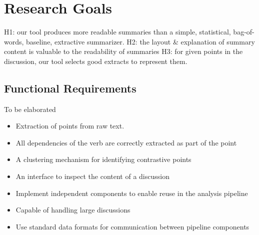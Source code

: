 \chapter{Research Goals\label{chap:requirements}}

  H1: our tool produces more readable summaries than a simple, statistical, bag-of-words, baseline, extractive summarizer.
  H2: the layout \& explanation of summary content is valuable to the readability of summaries
  H3: for given points in the discussion, our tool selects good extracts to represent them.

  \section{Functional Requirements}
    To be elaborated
    \begin{itemize}
      \item{Extraction of points from raw text.}
      \item{All dependencies of the verb are correctly extracted as part of the point}
      \item{A clustering mechanism for identifying contrastive points}
      \item{An interface to inspect the content of a discussion}
      \item{Implement independent components to enable reuse in the analysis pipeline}
      \item{Capable of handling large discussions}
      \item{Use standard data formats for communication between pipeline components}
    \end{itemize}
